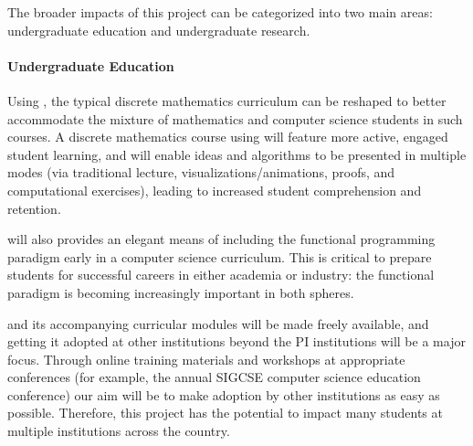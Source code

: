 The broader impacts of this project can be categorized into two main
areas: undergraduate education and undergraduate research.

\paragraph{Undergraduate Education}  Using \thelang, the typical
discrete mathematics curriculum can be reshaped to better accommodate
the mixture of mathematics and computer science students in such
courses.  A discrete mathematics course using \thelang will feature
more active, engaged student learning, and will enable ideas and
algorithms to be presented in multiple modes (via traditional lecture,
visualizations/animations, proofs, and computational exercises),
leading to increased student comprehension and retention.

\thelang will also provides an elegant means of including the
functional programming paradigm early in a computer science
curriculum.  This is critical to prepare students for successful
careers in either academia or industry: the functional paradigm is
becoming increasingly important in both spheres.


\thelang and its accompanying curricular modules will be made freely
available, and getting it adopted at other institutions beyond the PI
institutions will be a major focus.  Through online training materials
and workshops at appropriate conferences (for example, the annual
SIGCSE computer science education conference) our aim will be to make
adoption by other institutions as easy as possible.  Therefore, this
project has the potential to impact many students at multiple
institutions across the country.

